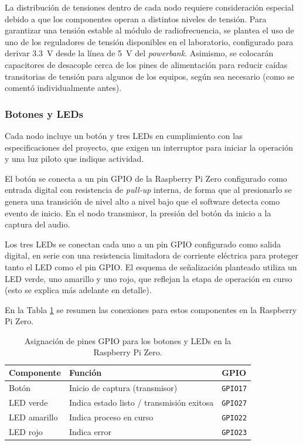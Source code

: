 La distribución de tensiones dentro de cada nodo requiere consideración especial debido a que los componentes operan a distintos niveles de tensión.
Para garantizar una tensión estable al módulo de radiofrecuencia, se plantea el uso de uno de los reguladores de tensión disponibles en el laboratorio, configurado para derivar \SI{3.3}{\volt} desde la línea de \SI{5}{\volt} del \textit{powerbank}.
Asimismo, se colocarán capacitores de desacople cerca de los pines de alimentación para reducir caídas transitorias de tensión para algunos de los equipos, según sea necesario (como se comentó individualmente antes).

\subsubsection{Botones y LEDs}

Cada nodo incluye un botón y tres LEDs en cumplimiento con las especificaciones del proyecto, que exigen un interruptor para iniciar la operación y una luz piloto que indique actividad.

El botón se conecta a un pin GPIO de la Raspberry Pi Zero configurado como entrada digital con resistencia de \textit{pull-up} interna, de forma que al presionarlo se genera una transición de nivel alto a nivel bajo que el software detecta como evento de inicio.
En el nodo transmisor, la presión del botón da inicio a la captura del audio.

Los tres LEDs se conectan cada uno a un pin GPIO configurado como salida digital, en serie con una resistencia limitadora de corriente eléctrica para proteger tanto el LED como el pin GPIO.
El esquema de señalización planteado utiliza un LED verde, uno amarillo y uno rojo, que reflejan la etapa de operación en curso (esto se explica más adelante en detalle).

En la Tabla \ref{tab:gpio_botones_leds} se resumen las conexiones para estos componentes en la Raspberry Pi Zero.

\begin{table}[htb]
    \centering
    \caption{Asignación de pines GPIO para los botones y LEDs en la Raspberry Pi Zero.}
    \label{tab:gpio_botones_leds}
    \begin{tabular}{@{}lp{4.5cm}l@{}}
        \toprule
        Componente   & Función & GPIO \\
        \midrule
        Botón        & Inicio de captura (transmisor)                   & \texttt{GPIO17} \\
        LED verde    & Indica estado listo / transmisión exitosa        & \texttt{GPIO27} \\
        LED amarillo & Indica proceso en curso                          & \texttt{GPIO22} \\
        LED rojo     & Indica error                                     & \texttt{GPIO23} \\
        \bottomrule
    \end{tabular}
\end{table}

